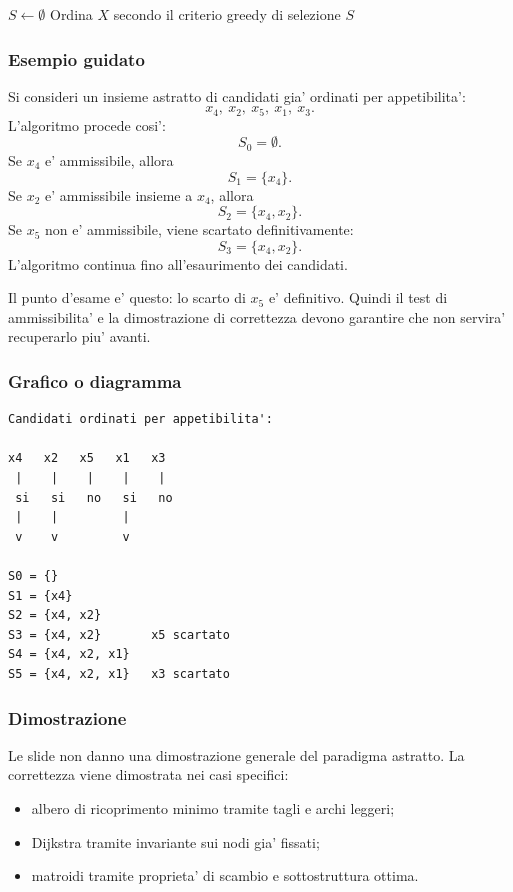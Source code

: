 \begin{algorithm}[H]
	\caption{\textsc{Greedy}$(X)$}
	$S\gets\emptyset$\;
	Ordina $X$ secondo il criterio greedy di selezione\;
	\Return $S$\;
\end{algorithm}

\subsubsection{Esempio guidato}
Si consideri un insieme astratto di candidati gia' ordinati per appetibilita':
\[
x_4,\ x_2,\ x_5,\ x_1,\ x_3.
\]
L'algoritmo procede cosi':
\[
S_0=\emptyset.
\]
Se $x_4$ e' ammissibile, allora
\[
S_1=\{x_4\}.
\]
Se $x_2$ e' ammissibile insieme a $x_4$, allora
\[
S_2=\{x_4,x_2\}.
\]
Se $x_5$ non e' ammissibile, viene scartato definitivamente:
\[
S_3=\{x_4,x_2\}.
\]
L'algoritmo continua fino all'esaurimento dei candidati.

Il punto d'esame e' questo: lo scarto di $x_5$ e' definitivo. Quindi il test di ammissibilita' e la dimostrazione di correttezza devono garantire che non servira' recuperarlo piu' avanti.

\subsubsection{Grafico o diagramma}
\begin{center}
\begin{verbatim}
Candidati ordinati per appetibilita':

x4   x2   x5   x1   x3
 |    |    |    |    |
 si   si   no   si   no
 |    |         |
 v    v         v

S0 = {}
S1 = {x4}
S2 = {x4, x2}
S3 = {x4, x2}       x5 scartato
S4 = {x4, x2, x1}
S5 = {x4, x2, x1}   x3 scartato
\end{verbatim}
\end{center}

\subsubsection{Dimostrazione}
Le slide non danno una dimostrazione generale del paradigma astratto. La correttezza viene dimostrata nei casi specifici:
\begin{itemize}
	\item albero di ricoprimento minimo tramite tagli e archi leggeri;
	\item Dijkstra tramite invariante sui nodi gia' fissati;
	\item matroidi tramite proprieta' di scambio e sottostruttura ottima.
\end{itemize}


